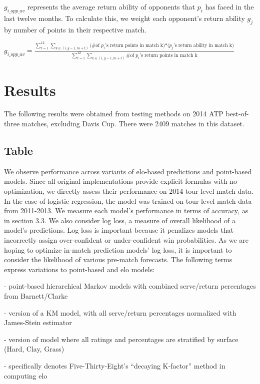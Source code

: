 \documentclass[chapterprefix=false]{report}
\begin{document}
$g_{i\_opp\_av}$ represents the average return ability of opponents that $p_i$ has faced in the last twelve months. To calculate this, we weight each opponent's return ability $g_j$ by number of points in their respective match.

$g_{i\_opp\_av} = \frac{\sum_{t=1}^{12}\sum_{k \in (i,y-1,m+t)}{\text{(\# of $p_i$'s return points in match k)*($p_j$'s return ability in match k)}}}{\sum_{t=1}^{12}\sum_{k \in (i,y-1,m+t)}\text{\# of $p_i$'s return points in match k}}$


\section{Results}
The following results were obtained from testing methods on 2014 ATP best-of-three matches, excluding Davis Cup. There were 2409 matches in this dataset. 

\subsection{Table}
We observe performance across variants of elo-based predictions and point-based models. Since all original implementations provide explicit formulas with no optimization, we directly assess their performance on 2014 tour-level match data. In the case of logistic regression, the model was trained on tour-level match data from 2011-2013. We measure each model's performance in terms of accuracy, as in section 3.3. We also consider log loss, a measure of overall likelihood of a model's predictions. Log loss is important because it penalizes models that incorrectly assign over-confident or under-confident win probabilities. As we are hoping to optimize in-match prediction models' log loss, it is important to consider the likelihood of various pre-match forecasts. The following terms express variations to point-based and elo models:

\begin{description}[leftmargin=2.5cm, labelindent=2.5cm]
\item[KM] - point-based hierarchical Markov models with combined serve/return percentages from Barnett/Clarke

\item[James-Stein] - version of a KM model, with all serve/return percentages normalized with James-Stein estimator

\item[surface] - version of model where all ratings and percentages are stratified by surface (Hard, Clay, Grass)

\item[538] - specifically denotes Five-Thirty-Eight's ``decaying K-factor'' method in computing elo
\end{description}
\end{document}
